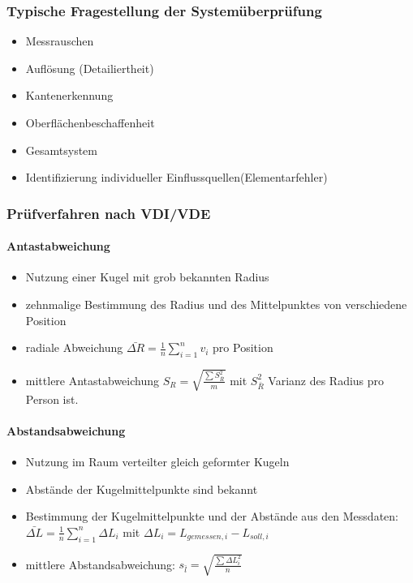 \documentclass[12pt]{article}
\begin{document}
\subsubsection{Typische Fragestellung der Systemüberprüfung}
\begin{itemize}
	\item Messrauschen
	\item Auflösung (Detailiertheit)
	\item Kantenerkennung
	\item Oberflächenbeschaffenheit
	\item Gesamtsystem
	\item Identifizierung individueller Einflussquellen(Elementarfehler)
\end{itemize}
\subsubsection{Prüfverfahren nach VDI/VDE}
\paragraph{Antastabweichung}
\begin{itemize}
	\item Nutzung einer Kugel mit grob bekannten Radius 
	\item zehnmalige Bestimmung des Radius und des Mittelpunktes von verschiedene Position
	\item radiale Abweichung $\bar{\Delta R} = \frac{1}{n} \sum_{i=1}^{n} v_i$ pro Position
	\item mittlere Antastabweichung $S_R = \sqrt{\frac{\sum S^2_{\bar{R}}}{m}}$ mit $S^2_{\bar{R}}$ Varianz des Radius pro Person ist.
\end{itemize}
\paragraph{Abstandsabweichung}
\begin{itemize}
	\item Nutzung im Raum verteilter gleich geformter Kugeln
	\item Abstände der Kugelmittelpunkte sind bekannt 
	\item Bestimmung der Kugelmittelpunkte und der Abstände aus den Messdaten: $\bar{\Delta L} = \frac{1}{n} \sum_{i=1}^{n} \Delta L_i$ mit $\Delta L_i = L_{gemessen,i} - L_{soll,i}$ 
	\item mittlere Abstandsabweichung: $s_{\bar{l}} = \sqrt{\frac{\sum \Delta L_i^2}{n}}$
\end{itemize}
\end{document}
